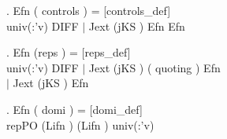 \begin{figure}[t]
\begin{minipage}{1.0\linewidth}
\begin{small}
\HOLTokenTurnstile{} \HOLTokenForall{}    .
     Efn    ( controls ) = \hfill{[controls\_def]}\\\hspace*{0.3in}
     univ(:'v) DIFF \HOLTokenLeftbrace{} $\mid$ Jext (jKS )   \HOLTokenSubset{} Efn    \HOLTokenRightbrace{} \HOLTokenUnion{}
     Efn    

\HOLTokenTurnstile{} \HOLTokenForall{}     .
     Efn    (reps   ) = \hfill{[reps\_def]}\\\hspace*{0.3in}
     univ(:'v) DIFF \HOLTokenLeftbrace{} $\mid$ Jext (jKS ) ( quoting )  \HOLTokenSubset{} Efn    \HOLTokenRightbrace{} \HOLTokenUnion{}\\\hspace*{0.3in}
     \HOLTokenLeftbrace{} $\mid$ Jext (jKS )   \HOLTokenSubset{} Efn    \HOLTokenRightbrace{}

\HOLTokenTurnstile{} \HOLTokenForall{}    .
     Efn    ( domi ) = \hfill{[domi\_def]}\\\hspace*{0.3in}
      repPO  (Lifn  ) (Lifn  )  univ(:'v)  \HOLTokenLeftbrace{}\HOLTokenRightbrace{}


\end{small}
\end{minipage}
\end{figure}
